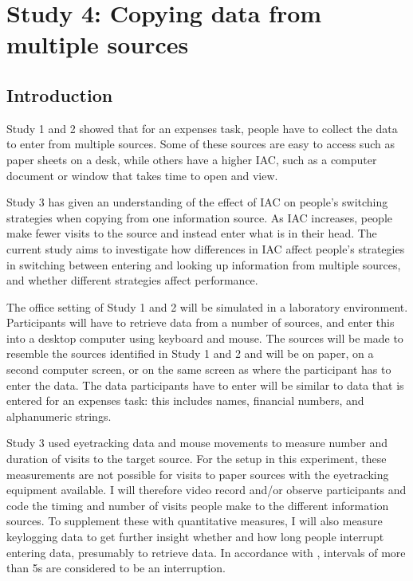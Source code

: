 \begin{table}
\section{Study 4: Copying data from multiple sources}
 
\subsection{Introduction}
Study 1 and 2 showed that for an expenses task, people have to collect the data to enter from multiple sources. Some of these sources are easy to access such as paper sheets on a desk, while others have a higher IAC, such as a computer document or window that takes time to open and view.

Study 3 has given an understanding of the effect of IAC on people's switching strategies when copying from one information source. As IAC increases, people make fewer visits to the source and instead enter what is in their head. 
The current study aims to investigate how differences in IAC affect people's strategies in switching between entering and looking up information from multiple sources, and whether different strategies affect performance.

The office setting of Study 1 and 2 will be simulated in a laboratory environment. Participants will have to retrieve data from a number of sources, and enter this into a desktop computer using keyboard and mouse. The sources will be made to resemble the sources identified in Study 1 and 2 and will be on paper, on a second computer screen, or on the same screen as where the participant has to enter the data. The data participants have to enter will be similar to data that is entered for an expenses task: this includes names, financial numbers, and alphanumeric strings. 

Study 3 used eyetracking data and mouse movements to measure number and duration of visits to the target source. For the setup in this experiment, these measurements are not possible for visits to paper sources with the eyetracking equipment available.
I will therefore video record and/or observe participants and code the timing and number of visits people make to the different information sources.
To supplement these with quantitative measures, I will also measure keylogging data to get further insight whether and how long people interrupt entering data, presumably to retrieve data. In accordance with \citet{Gould2016}, intervals of more than 5s are considered to be an interruption. 


\end{table}
